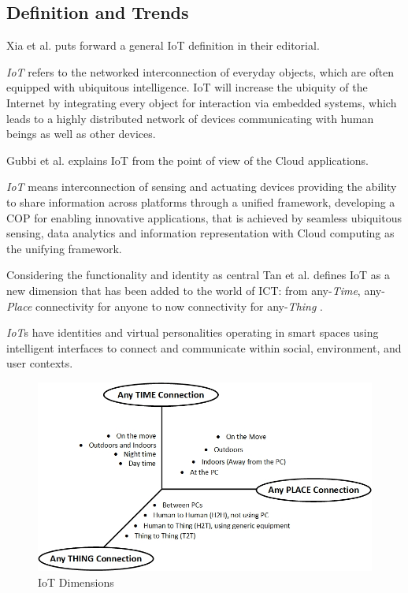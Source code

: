 \subsection{Definition and Trends}
Xia et al. \cite{IOTXIA} puts forward a general \acs{IoT} definition in their editorial.
\begin{definition}
\textit{\acs{IoT}} refers to the networked interconnection of everyday objects, which are often equipped with ubiquitous intelligence. IoT will increase the ubiquity of the Internet by integrating every object for interaction via embedded systems, which leads to a highly distributed network of devices communicating with human beings as well as other devices.
\end{definition}
Gubbi et al. \cite{IOTGUBBI} explains \acs{IoT} from the point of view of the Cloud applications.
\begin{definition}
	\textit{\acs{IoT}} means interconnection of sensing and actuating devices providing the ability to share information across platforms through a unified framework, developing a \acs{COP} for enabling innovative applications, that is achieved by seamless ubiquitous sensing, data analytics and information representation with Cloud computing as the unifying framework.
\end{definition}
Considering the functionality and identity as central Tan et al. \cite{IOTFUTURE} defines \acs{IoT} as a new dimension that has been added to the world of \acs{ICT}: from any-\textit{Time}, any-\textit{Place} connectivity for anyone to now connectivity for any-\textit{Thing} .
\begin{definition}
\textit{\acs{IoT}}s have identities and virtual personalities operating in smart spaces using intelligent interfaces to connect and communicate within social, environment, and user contexts.
\end{definition}
\begin{figure}[h!]
	\includegraphics[scale=0.5]{./gfx/dimension}
	\centering
	\caption{\acs{IoT} Dimensions \cite{IOTFUTURE}}
	\label{fig:2.6}
\end{figure}
